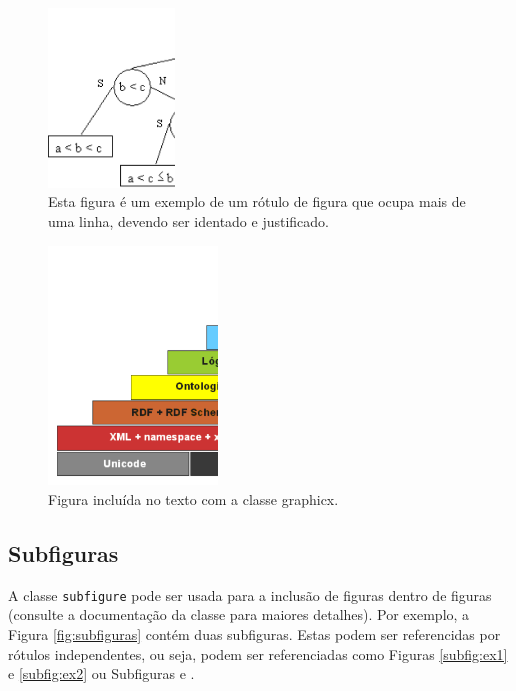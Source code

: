 \begin{figure}[H]
 \centering
 \includegraphics[width=0.30\textwidth]{./fig/exemploFig2}
 \caption{Esta figura é um exemplo de um rótulo de figura que ocupa mais de uma linha, devendo ser identado e justificado.}
 \label{fig:exemploFig2}
\end{figure}

\begin{figure}[H]
 \centering
  \includegraphics[width=0.40\textwidth]{./fig/exemploFig3}
  \caption{Figura incluída no texto com a classe graphicx.}
 \label{fig:exemploFig3}
\end{figure}

\subsection{Subfiguras}
\label{subsec:subfigs} 
A classe \verb|subfigure| pode ser usada para a inclusão de figuras dentro de figuras (consulte a documentação da classe para maiores detalhes). Por exemplo, a Figura \ref{fig:subfiguras} contém duas subfiguras. Estas podem ser referencidas por rótulos independentes, ou seja, podem ser referenciadas como Figuras \ref{subfig:ex1} e \ref{subfig:ex2} ou Subfiguras  e .

